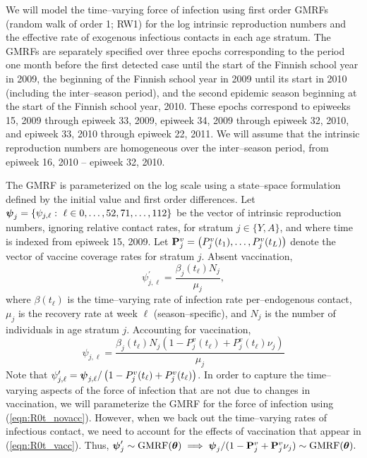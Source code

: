 We will model the time--varying force of infection using first order GMRFs (random walk of order 1; RW1) for the log intrinsic reproduction numbers and the effective rate of exogenous infectious contacts in each age stratum. The GMRFs are separately specified over three epochs corresponding to the period one month before the first detected case until the start of the Finnish school year in 2009, the beginning of the Finnish school year in 2009 until its start in 2010 (including the inter--season period), and the second epidemic season beginning at the start of the Finnish school year, 2010. These epochs correspond to epiweeks 15, 2009 through epiweek 33, 2009, epiweek 34, 2009 through epiweek 32, 2010, and epiweek 33, 2010 through epiweek 22, 2011. We will assume that the intrinsic reproduction numbers are homogeneous over the inter--season period, from epiweek 16, 2010 -- epiweek 32, 2010.

The GMRF is parameterized on the log scale using a state--space formulation defined by the initial value and first order differences. Let $ \boldsymbol{\psi}_{j} = \lbrace\psi_{j,\ell}:\ \ell \in 0,\dots,52,71,\dots,112\rbrace $ be the vector of intrinsic reproduction numbers, ignoring relative contact rates, for stratum $ j \in \lbrace Y,A \rbrace$, and where time is indexed from epiweek 15, 2009. Let $ \mathbf{P}^v_j = \left (P^v_j(t_1),\dots,P^v_j(t_L)\right )$ denote the vector of vaccine coverage rates for stratum $ j $. Absent vaccination,
\begin{equation}
\label{eqn:R0t_novacc}
\psi^\prime_{j,\ell} = \frac{\beta_j(t_\ell)N_j}{\mu_j},
\end{equation}
where $ \beta(t_\ell) $ is the time--varying rate of infection rate per--endogenous contact, $ \mu_j$ is the recovery rate at week $ \ell $ (season--specific), and $ N_{j} $ is the number of individuals in age stratum $ j $. Accounting for vaccination, 
\begin{equation}
\label{eqn:R0t_vacc}
\psi_{j,\ell} = \frac{\beta_j(t_\ell)N_j\left (1 - P^v_j(t_\ell) + P^v_j(t_\ell)\nu_j\right )}{\mu_j}
\end{equation}
Note that $ \psi_{j,\ell}^\prime = \boldsymbol{\psi}_{j,\ell} / \left (1 - P^v_j(t_\ell) + P^v_j(t_\ell)\right ) $. In order to capture the time--varying aspects of the force of infection that are not due to changes in vaccination, we will parameterize the GMRF for the force of infection using (\ref{eqn:R0t_novacc}). However, when we back out the time--varying rates of infectious contact, we need to account for the effects of vaccination that appear in (\ref{eqn:R0t_vacc}). Thus, $ \boldsymbol{\psi}_j^\prime\sim \mathrm{GMRF}(\boldsymbol{\theta}) \implies\boldsymbol{\psi}_j / (1 - \mathbf{P}^v_j + \mathbf{P}^v_j\nu_j) \sim \mathrm{GMRF}(\boldsymbol{\theta}). $

